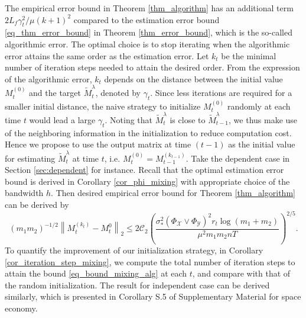 \documentclass[12pt]{article}
\begin{document}
The empirical error bound in Theorem \ref{thm_algorithm} has an additional term $2L_f\gamma_t^2/\mu(k+1)^2$ compared to the estimation error bound \eqref{eq_thm_error_bound} in Theorem \ref{thm_error_bound}, which is the so-called algorithmic error. The optimal choice is to stop iterating when the algorithmic error attains the same order as the estimation error. Let $k_t$ be the minimal number of iteration steps needed to attain the desired order. From the expression of the algorithmic error, $k_t$ depends on the distance between the initial value $M_t^{(0)}$ and the target $\widetilde{M}^\lambda_t$, denoted by $\gamma_t$. Since less iterations are required for a smaller initial distance, the naive strategy to initialize $M_t^{(0)}$ randomly at each time $t$ would lead a large $\gamma_t$. Noting that $\widetilde{M}_t^\lambda$ is close to $\widetilde{M}_{t-1}^\lambda$, we thus make use of the neighboring information in the initialization to reduce computation cost.
Hence we propose to use the output matrix at time $(t-1)$ as the initial value for estimating $\widetilde{M}_t^\lambda$ at time $t$, i.e. $M_t^{(0)}=M_{t-1}^{(k_{t-1})}$. 
Take the dependent case in Section \ref{sec:dependent} for instance. Recall that the optimal estimation error bound is derived in Corollary \ref{cor_phi_mixing} with appropriate choice of the bandwidth $h$. 
Then desired empirical error bound for Theorem \ref{thm_algorithm} can be derived by
\begin{equation}\label{eq_bound_mixing_alg}
	(m_1m_2)^{-1/2}\left\|M_t^{(k_t)} - M_t^0\right\|_2 \le 2\mathcal{C}_2\left(\frac{\sigma_*^2(\Phi_\mathcal{X}\vee \Phi_\mathcal{Y})^2r_t\log(m_1+m_2)}{\mu^2m_1m_2 n T}\right)^{2/5}.
\end{equation}
To quantify the improvement of our initialization strategy, in Corollary \ref{cor_iteration_step_mixing}, we compute the total number of iteration steps to attain the bound \eqref{eq_bound_mixing_alg} at each $t$, and compare with that of the random initialization.
The result for independent case can be derived similarly, which is presented in Corollary S.5 of Supplementary Material for space economy.
\end{document}
